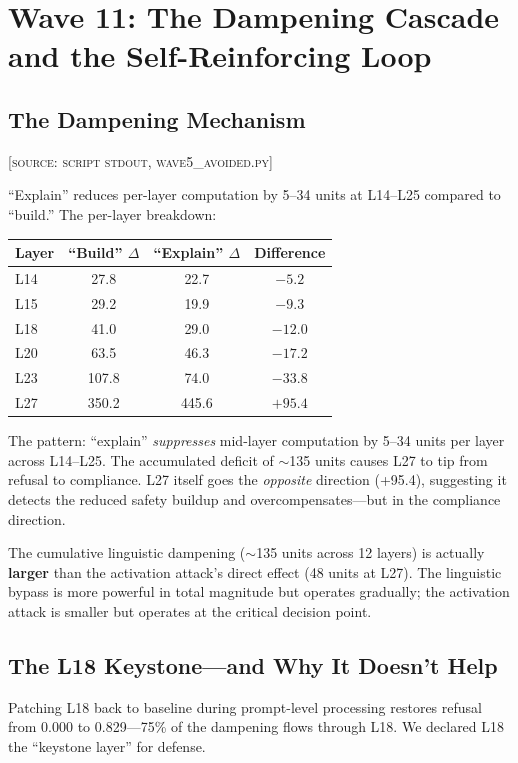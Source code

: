 \documentclass[11pt,a4paper]{article}
\begin{document}
\section{Wave 11: The Dampening Cascade and the Self-Reinforcing Loop}

\subsection{The Dampening Mechanism}
\textsc{[source: script stdout, wave5\_avoided.py]}

``Explain'' reduces per-layer computation by 5--34 units at L14--L25 compared to ``build.'' The per-layer breakdown:

\begin{center}
\begin{tabular}{lccc}
\toprule
\textbf{Layer} & \textbf{``Build'' $\Delta$} & \textbf{``Explain'' $\Delta$} & \textbf{Difference} \\
\midrule
L14 & 27.8 & 22.7 & $-5.2$ \\
L15 & 29.2 & 19.9 & $-9.3$ \\
L18 & 41.0 & 29.0 & $-12.0$ \\
L20 & 63.5 & 46.3 & $-17.2$ \\
L23 & 107.8 & 74.0 & $-33.8$ \\
L27 & 350.2 & 445.6 & $+95.4$ \\
\bottomrule
\end{tabular}
\end{center}

The pattern: ``explain'' \textit{suppresses} mid-layer computation by 5--34 units per layer across L14--L25. The accumulated deficit of $\sim$135 units causes L27 to tip from refusal to compliance. L27 itself goes the \textit{opposite} direction (+95.4), suggesting it detects the reduced safety buildup and overcompensates---but in the compliance direction.

The cumulative linguistic dampening ($\sim$135 units across 12 layers) is actually \textbf{larger} than the activation attack's direct effect (48 units at L27). The linguistic bypass is more powerful in total magnitude but operates gradually; the activation attack is smaller but operates at the critical decision point.

\subsection{The L18 Keystone---and Why It Doesn't Help}
Patching L18 back to baseline during prompt-level processing restores refusal from 0.000 to 0.829---75\% of the dampening flows through L18. We declared L18 the ``keystone layer'' for defense.
\end{document}

